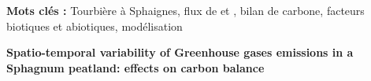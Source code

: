 {\begin{framed}
\begin{minipage}{\dimexpr\textwidth-2\fboxrule-2\fboxsep}

\textbf{Mots cl\'es :} Tourbière à Sphaignes, flux de \coo et \chh, bilan de carbone, facteurs biotiques et abiotiques, modélisation
	\end{minipage}
\end{framed}

\vfill

\begin{center}
	\large \textbf{Spatio-temporal variability of Greenhouse gases emissions in a Sphagnum peatland: effects on carbon balance}
\end{center}

}

